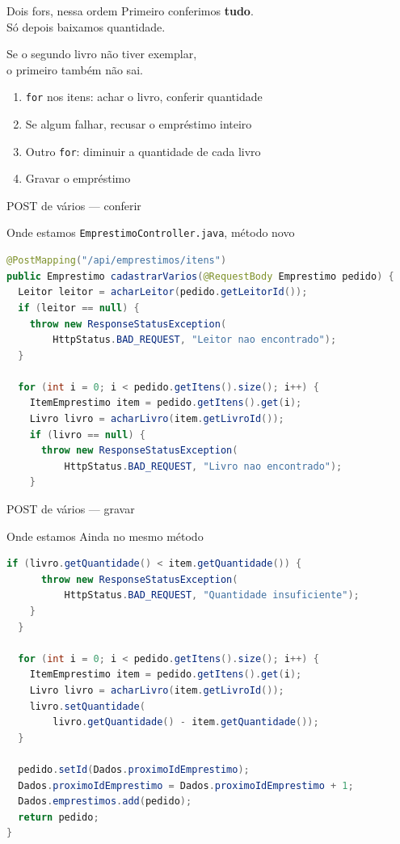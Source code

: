 \documentclass[aspectratio=169,11pt]{beamer}
\newcommand{\onde}[1]{%
  \begin{block}{Onde estamos}
    #1
  \end{block}
}
\begin{document}
\begin{frame}{Dois fors, nessa ordem}
  Primeiro conferimos \textbf{tudo}.\\
  Só depois baixamos quantidade.

  \vspace{0.5em}
  Se o segundo livro não tiver exemplar,\\
  o primeiro também não sai.

  \vspace{0.5em}
  \begin{enumerate}
    \item \texttt{for} nos itens: achar o livro, conferir quantidade
    \item Se algum falhar, recusar o empréstimo inteiro
    \item Outro \texttt{for}: diminuir a quantidade de cada livro
    \item Gravar o empréstimo
  \end{enumerate}
\end{frame}

\begin{frame}[fragile]{POST de vários --- conferir}
  \onde{\texttt{EmprestimoController.java}, método novo}

\begin{lstlisting}[language=Java,basicstyle=\ttfamily\scriptsize]
@PostMapping("/api/emprestimos/itens")
public Emprestimo cadastrarVarios(@RequestBody Emprestimo pedido) {
  Leitor leitor = acharLeitor(pedido.getLeitorId());
  if (leitor == null) {
    throw new ResponseStatusException(
        HttpStatus.BAD_REQUEST, "Leitor nao encontrado");
  }

  for (int i = 0; i < pedido.getItens().size(); i++) {
    ItemEmprestimo item = pedido.getItens().get(i);
    Livro livro = acharLivro(item.getLivroId());
    if (livro == null) {
      throw new ResponseStatusException(
          HttpStatus.BAD_REQUEST, "Livro nao encontrado");
    }
\end{lstlisting}
\end{frame}

\begin{frame}[fragile,shrink=5]{POST de vários --- gravar}
  \onde{Ainda no mesmo método}

\begin{lstlisting}[language=Java,basicstyle=\ttfamily\scriptsize]
    if (livro.getQuantidade() < item.getQuantidade()) {
      throw new ResponseStatusException(
          HttpStatus.BAD_REQUEST, "Quantidade insuficiente");
    }
  }

  for (int i = 0; i < pedido.getItens().size(); i++) {
    ItemEmprestimo item = pedido.getItens().get(i);
    Livro livro = acharLivro(item.getLivroId());
    livro.setQuantidade(
        livro.getQuantidade() - item.getQuantidade());
  }

  pedido.setId(Dados.proximoIdEmprestimo);
  Dados.proximoIdEmprestimo = Dados.proximoIdEmprestimo + 1;
  Dados.emprestimos.add(pedido);
  return pedido;
}
\end{lstlisting}
\end{frame}
\end{document}
